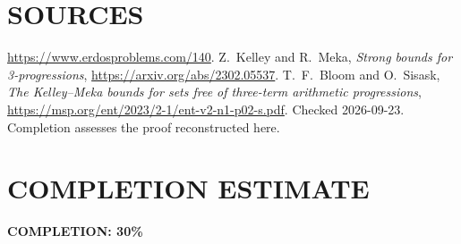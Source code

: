 \section{SOURCES}
\url{https://www.erdosproblems.com/140}.
Z.~Kelley and R.~Meka, \emph{Strong bounds for 3-progressions},
\url{https://arxiv.org/abs/2302.05537}.
T.~F.~Bloom and O.~Sisask, \emph{The Kelley--Meka bounds for sets free
of three-term arithmetic progressions},
\url{https://msp.org/ent/2023/2-1/ent-v2-n1-p02-s.pdf}.
Checked 2026-09-23. Completion assesses the proof reconstructed here.

\section{COMPLETION ESTIMATE}
\textbf{COMPLETION: 30\%}

